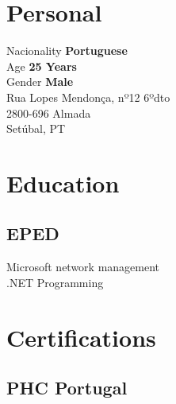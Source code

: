 \documentclass[letterpaper]{deedy-resume} %
\begin{document}

\lastupdated %



\begin{minipage}[t]{0.33\textwidth}

\section{Personal} 

Nacionality \textbf{Portuguese}\\
Age \textbf{25 Years}\\
Gender \textbf{Male}\\

Rua Lopes Mendonça, nº12 6ºdto\\
2800-696 Almada\\
Setúbal, PT\\

\sectionspace

\section{Education}
\subsection{EPED}
Microsoft network management\\
.NET Programming

\sectionspace

\section{Certifications}
\subsection{PHC Portugal}


\end{minipage}
\end{document}
